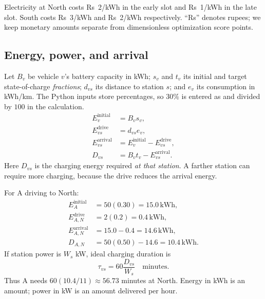 Electricity at North costs Rs~2/kWh in the early slot and Rs~1/kWh in the late
slot. South costs Rs~3/kWh and Rs~2/kWh respectively. ``Rs'' denotes rupees;
we keep monetary amounts separate from dimensionless optimization score points.

\subsection{Energy, power, and arrival}
Let $B_v$ be vehicle $v$'s battery capacity in kWh; $s_v$ and $t_v$ its initial
and target state-of-charge \emph{fractions}; $d_{vs}$ its distance to station $s$;
and $e_v$ its consumption in kWh/km. The Python inputs store percentages, so
$30\%$ is entered as  and divided by $100$ in the calculation.
\begin{align}
E_v^{\mathrm{initial}} &= B_v s_v,\\
E_{vs}^{\mathrm{drive}} &= d_{vs}e_v,\\
E_{vs}^{\mathrm{arrival}} &= E_v^{\mathrm{initial}}-E_{vs}^{\mathrm{drive}},\\
D_{vs} &= B_v t_v-E_{vs}^{\mathrm{arrival}}.
\end{align}
Here $D_{vs}$ is the charging energy required \emph{at that station}. A farther
station can require more charging, because the drive reduces the arrival energy.

For A driving to North:
\begin{align*}
E_A^{\mathrm{initial}} &= 50(0.30)=15.0\,\mathrm{kWh},\\
E_{A,N}^{\mathrm{drive}} &= 2(0.2)=0.4\,\mathrm{kWh},\\
E_{A,N}^{\mathrm{arrival}} &=15.0-0.4=14.6\,\mathrm{kWh},\\
D_{A,N} &=50(0.50)-14.6=10.4\,\mathrm{kWh}.
\end{align*}
If station power is $W_s$ kW, ideal charging duration is
\begin{equation}
\tau_{vs}=60\frac{D_{vs}}{W_s}\quad\text{minutes}.
\end{equation}
Thus A needs $60(10.4/11)\approx56.73$ minutes at North. Energy in kWh is an
amount; power in kW is an amount delivered per hour.

